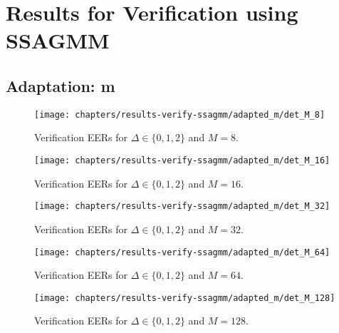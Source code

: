 \chapter{Results for Verification using SSAGMM}
\label{apx:results-verify-ssagmm}

\section{Adaptation: m}



\begin{figure}[ht]
	\centering
	\texttt{[image: chapters/results-verify-ssagmm/adapted\_m/det\_M\_8]}
	\caption{Verification EERs for $\Delta \in \{0, 1, 2\}$ and $M = 8$.}
	\label{fig:results-verify-ssagmm_M_8}
\end{figure}

\newpage


\begin{figure}[ht]
	\centering
	\texttt{[image: chapters/results-verify-ssagmm/adapted\_m/det\_M\_16]}
	\caption{Verification EERs for $\Delta \in \{0, 1, 2\}$ and $M = 16$.}
	\label{fig:results-verify-ssagmm_M_16}
\end{figure}

\newpage


\begin{figure}[ht]
	\centering
	\texttt{[image: chapters/results-verify-ssagmm/adapted\_m/det\_M\_32]}
	\caption{Verification EERs for $\Delta \in \{0, 1, 2\}$ and $M = 32$.}
	\label{fig:results-verify-ssagmm_M_32}
\end{figure}

\newpage


\begin{figure}[ht]
	\centering
	\texttt{[image: chapters/results-verify-ssagmm/adapted\_m/det\_M\_64]}
	\caption{Verification EERs for $\Delta \in \{0, 1, 2\}$ and $M = 64$.}
	\label{fig:results-verify-ssagmm_M_64}
\end{figure}

\newpage


\begin{figure}[ht]
	\centering
	\texttt{[image: chapters/results-verify-ssagmm/adapted\_m/det\_M\_128]}
	\caption{Verification EERs for $\Delta \in \{0, 1, 2\}$ and $M = 128$.}
	\label{fig:results-verify-ssagmm_M_128}
\end{figure}

